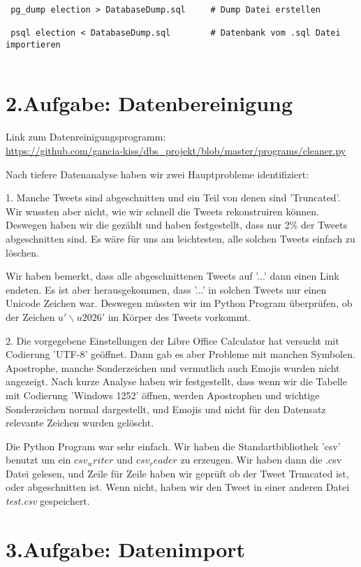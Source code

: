 \begin{verbatim}
 pg_dump election > DatabaseDump.sql     # Dump Datei erstellen
 
 psql election < DatabaseDump.sql        # Datenbank vom .sql Datei importieren
 
\end{verbatim}



\section*{2.Aufgabe: Datenbereinigung}

Link zum Datenreinigungsprogramm: \\
\url{https://github.com/gancia-kiss/dbs_projekt/blob/master/programs/cleaner.py}

Nach tiefere Datenanalyse haben wir zwei Hauptprobleme identifiziert:

1. Manche Tweets sind abgeschnitten und ein Teil von denen sind 'Truncated'. Wir wussten aber nicht, wie wir schnell die Tweets rekonstruiren können. Deswegen haben wir die gezählt und haben festgestellt, dass nur 2\% der Tweets abgeschnitten sind. Es wäre für uns am leichtesten, alle solchen Tweets einfach zu löschen.

Wir haben bemerkt, dass alle abgeschnittenen Tweets auf '...' dann einen Link endeten. Es ist aber herausgekommen, dass '...' in solchen Tweets nur einen Unicode Zeichen war.  Deswegen müssten wir im Python Program überprüfen, ob der Zeichen \textit{$u'\backslash u2026'$} im Körper des Tweets vorkommt.

2. Die vorgegebene Einstellungen der Libre Office Calculator hat versucht mit Codierung 'UTF-8' geöffnet. Dann gab es aber Probleme mit manchen Symbolen. Apostrophe, manche Sonderzeichen und vermutlich auch Emojis wurden nicht angezeigt. Nach kurze Analyse haben wir festgestellt, dass wenn wir die Tabelle mit Codierung 'Windows 1252' öffnen, werden Apostrophen und wichtige Sonderzeichen normal dargestellt, und Emojis und nicht für den Datensatz relevante Zeichen wurden gelöscht.

Die Python Program war sehr einfach. Wir haben die Standartbibliothek 'csv' benutzt um ein $csv_writer$ und $csv_reader$ zu erzeugen. Wir haben dann die .csv Datei gelesen, und Zeile für Zeile haben wir geprüft ob der Tweet Truncated ist, oder abgeschnitten ist. Wenn nicht, haben wir den Tweet in einer anderen Datei \textit{test.csv} gespeichert. 

\section*{3.Aufgabe: Datenimport}


